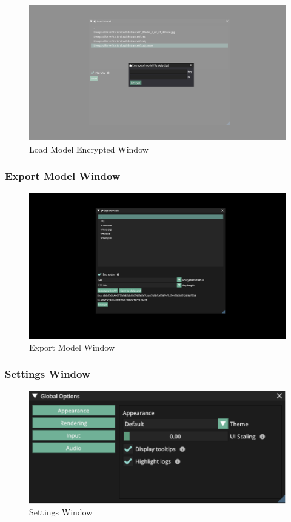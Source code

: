 \documentclass[11pt]{article}
\begin{document}
\begin{figure}[H]
  \centering
  \includegraphics[width=\textwidth]{images/load_model_encrypted_window.png}
  \caption{Load Model Encrypted Window}
  \label{fig:load_model_encrypted_window}
\end{figure}

\subsubsection{Export Model Window}
\begin{figure}[H]
  \centering
  \includegraphics[width=\textwidth]{images/encryption_system.png}
  \caption{Export Model Window}
  \label{fig:encryption_window}
\end{figure}

\subsubsection{Settings Window}

\begin{figure}[H]
  \centering
  \includegraphics[width=\textwidth]{images/settings_window.png}
  \caption{Settings Window}
  \label{fig:settings_window}
\end{figure}
\end{document}
